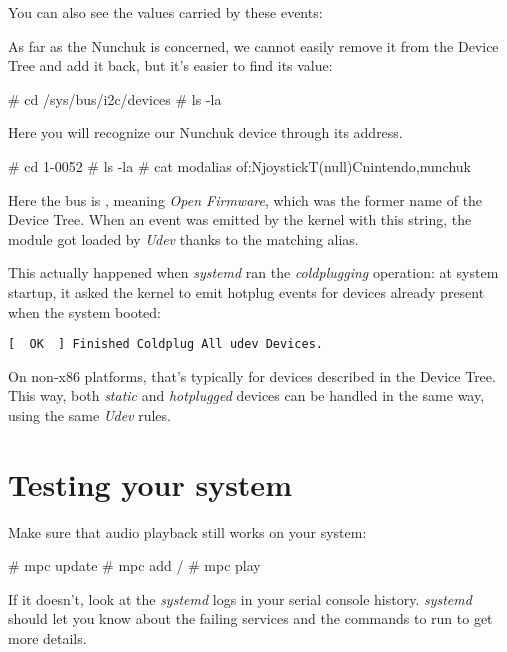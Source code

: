 You can also see the  values carried by these events:


As far as the Nunchuk is concerned, we cannot easily remove it from the
Device Tree and add it back, but it's easier to find its 
value:

\begin{bashinput}
# cd /sys/bus/i2c/devices
# ls -la
\end{bashinput}

Here you will recognize our Nunchuk device through its 
address.

\begin{bashinput}
# cd 1-0052
# ls -la
# cat modalias
of:NjoystickT(null)Cnintendo,nunchuk
\end{bashinput}

Here the bus is , meaning {\em Open Firmware}, which
was the former name of the Device Tree. When an event was emitted by
the kernel with this  string, the  module
got loaded by {\em Udev} thanks to the matching alias.

This actually happened when {\em systemd} ran the {\em coldplugging}
operation: at system startup, it asked the kernel to emit hotplug events
for devices already present when the system booted:

\begin{verbatim}
[  OK  ] Finished Coldplug All udev Devices.
\end{verbatim}

On non-x86 platforms, that's typically for devices described in the
Device Tree. This way, both {\em static} and {\em hotplugged} devices
can be handled in the same way, using the same {\em Udev} rules.

\section{Testing your system}

Make sure that audio playback still works on your system:

\begin{bashinput}
# mpc update
# mpc add /
# mpc play
\end{bashinput}

If it doesn't, look at the {\em systemd} logs in your serial console
history. {\em systemd} should let you know about the failing services
and the commands to run to get more details.
